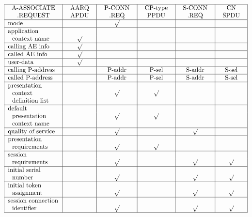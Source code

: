 \begin{bwslide}

\scriptsize
\[\begin{tabular}{|l|c|c|c|c|c|}
\hline
\begin{tabular}{c}A-ASSOCIATE\\ .REQUEST\end{tabular}&
		\begin{tabular}{c}AARQ\\ APDU\end{tabular}&
			\begin{tabular}{c}P-CONN\\ .REQ\end{tabular}&
				\begin{tabular}{c}CP-type\\ PPDU\end{tabular}&
					\begin{tabular}{c}S-CONN\\ .REQ\end{tabular}&
						\begin{tabular}{c}CN\\ SPDU\end{tabular}\\
\hline
mode&		&	\X/&	&	&	\\
\hline
application&	&	&	&	&	\\
\ \ context name&\X/&	&	&	&	\\
\hline
calling AE info&\X/&	&	&	&	\\
\hline
called AE info&	\X/&	&	&	&	\\
\hline
user-data&	\X/&	&	&	&	\\
\hline
calling P-address&
		&	P-addr&
				P-sel&
					S-addr&	
						S-sel\\
\hline
called P-address&
		&	P-addr&
				P-sel&
					S-addr&	
						S-sel\\
\hline
presentation&	&	&	&	&	\\
\ \ context&	&	\X/&	\X/&	&	\\
\ \ definition list&
		&	&	&	&	\\
\hline
default&	&	&	&	&	\\
\ \ presentation&&	\X/&	\X/&	&	\\
\ \ context name&
		&	&	&	&	\\
\hline
quality of service&
		&	\X/&	&	\X/&	\\
\hline
presentation&	&	&	&	&	\\
\ \ requirements&&	\X/&	\X/&	&	\\
\hline
session&	&	&	&	&	\\
\ \ requirements&&	\X/&	&	\X/&	\X/\\
\hline
initial serial&	&	&	&	&	\\
\ \ number&	&	\X/&	&	\X/&	\X/\\
\hline
initial token&	&	&	&	&	\\
\ \ assignment&	&	\X/&	&	\X/&	\X/\\
\hline
session connection&
		&	&	&	&	\\
\ \ identifier&	&	\X/&	&	\X/&	\X/\\
\hline
\end{tabular}\]
\end{bwslide}


